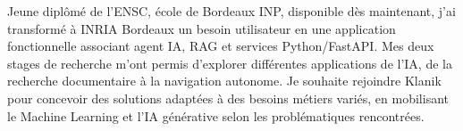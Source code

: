 
\begin{cvparagraph}
Jeune diplômé de l’ENSC, école de Bordeaux INP, disponible dès maintenant, j’ai transformé à INRIA Bordeaux un besoin utilisateur en une application fonctionnelle associant agent IA, RAG et services Python/FastAPI. Mes deux stages de recherche m’ont permis d’explorer différentes applications de l’IA, de la recherche documentaire à la navigation autonome. Je souhaite rejoindre Klanik pour concevoir des solutions adaptées à des besoins métiers variés, en mobilisant le Machine Learning et l’IA générative selon les problématiques rencontrées.
\end{cvparagraph}
